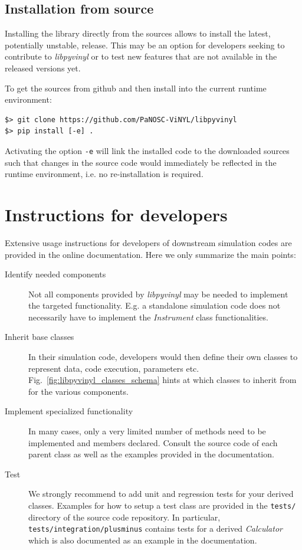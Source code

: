 \documentclass[10pt]{scrartcl}
\begin{document}
\subsection{Installation from source}
\label{sec:source}

Installing the library directly from the sources allows to install the latest,
potentially unstable, release. This may be an option for developers seeking to
contribute to \textit{libpyvinyl} or to test new features that are not available
in the released versions yet.

To get the sources from github and then install into the current runtime environment:
\begin{verbatim}
$> git clone https://github.com/PaNOSC-ViNYL/libpyvinyl
$> pip install [-e] .
\end{verbatim}
Activating the option \texttt{-e} will link the installed code to the downloaded
sources such that changes in the source code would immediately be reflected in
the runtime environment, i.e. no re-installation is required.

\section{Instructions for developers}
\label{sec:dev}
Extensive usage instructions for developers of downstream simulation codes are
provided in the online documentation. Here we only summarize the main points:
\begin{description}
\item[Identify needed components] Not all components provided by
  \textit{libpyvinyl} may be needed to implement the targeted functionality.
  E.g. a standalone simulation code does not necessarily have to implement the
  \textit{Instrument} class functionalities.
 
\item[Inherit base classes] In their simulation code, developers would then
  define their own classes to represent data, code execution, parameters etc.
  Fig.~\ref{fig:libpyvinyl_classes_schema} hints at which classes to inherit
  from for the various components.

 
\item[Implement specialized functionality] In many cases, only a very limited
  number of methods need to be implemented and members declared. Consult the
  source code of each parent class as well as the examples provided in the
  documentation.

 
\item[Test] We strongly recommend to add unit and regression tests for your
  derived classes. Examples for how to setup a test class are provided in the
  \texttt{tests/} directory of the source code repository. In particular,
  \texttt{tests/integration/plusminus} contains tests for a derived
  \textit{Calculator} which is also documented as an example in the documentation.
  
\end{description}
\end{document}
